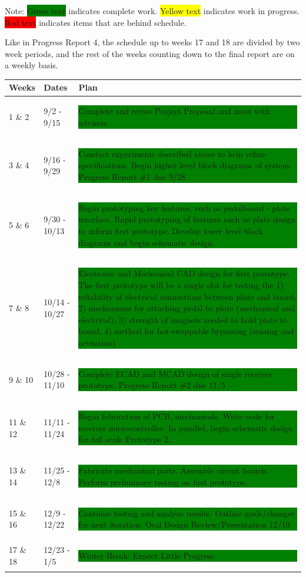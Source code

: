 \documentclass{article}
\begin{document}
	Note: \colorbox{green}{Green text} indicates complete work.  \colorbox{yellow}{Yellow text} indicates work in progress.  \colorbox{red}{Red text} indicates items that are behind schedule.

	Like in Progress Report 4, the schedule up to weeks 17 and 18 are divided by two week periods, and the rest of the weeks counting down to the final report are on a weekly basis.

	\begin{table}[H]
	\begin{tabular}{llp{4in}}
	Weeks    & Dates         & Plan \\
	\hline
	1 \& 2   & 9/2 - 9/15    &  \colorbox{green}{\parbox{4in}{Complete and revise Project Proposal and meet with advisers}}      \\
	3 \& 4   & 9/16 - 9/29   &  \colorbox{green}{\parbox{4in}{Conduct experiments described above to help refine specifications. Begin higher level block diagrams of system.  Progress Report \#1 due 9/28 }}    \\
	5 \& 6   & 9/30 - 10/13  &  \colorbox{green}{\parbox{4in}{Begin prototyping key features, such as pedalboard - plate interface. Rapid prototyping of features such as plate design to inform first prototype. Develop lower level block diagrams and begin schematic design.}}     \\
	7 \& 8   & 10/14 - 10/27 &  \colorbox{green}{\parbox{4in}{Electronic and Mechanical CAD design for first prototype.  The first prototype will be a single slot for testing the 1) reliability of electrical connections between plate and board, 2) mechanisms for attaching pedal to plate (mechanical and electrical), 3) strength of magnets needed to hold plate to board, 4) method for hot-swappable bypassing (sensing and actuation)}}     \\
	9 \& 10  & 10/28 - 11/10 & \colorbox{green}{\parbox{4in}{Complete ECAD and MCAD design of single receiver prototype.  Progress Report \#2 due 11/5  } } \\
	11 \& 12 & 11/11 - 11/24 &  \colorbox{green}{\parbox{4in}{Begin fabrication of PCB, mechanicals.  Write code for receiver microcontroller.  In parallel, begin schematic design for full scale Prototype 2. }} \\
	13 \& 14 & 11/25 - 12/8  & \colorbox{green}{\parbox{4in}{Fabricate mechanical parts.  Assemble circuit boards.  Perform preliminary testing on first prototype.   }  } \\
	15 \& 16 & 12/9 - 12/22  &  \colorbox{green}{\parbox{4in}{Continue testing and analyze results.  Outline goals/changes for next iteration.  Oral Design Review/Presentation 12/10   } }\\
	17 \& 18 & 12/23 - 1/5   &  \colorbox{green}{\parbox{4in}{Winter Break: Expect Little Progress   } }\\
	\end{tabular}
	\end{table}
\end{document}
